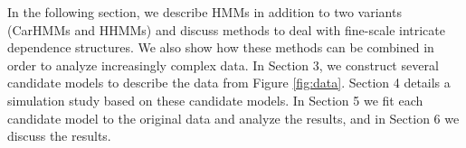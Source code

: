 
In the following section, we describe HMMs in addition to two variants (CarHMMs and HHMMs) and discuss methods to deal with fine-scale intricate dependence structures. We also show how these methods can be combined in order to analyze increasingly complex data. In Section 3, we construct several candidate models to describe the data from Figure \ref{fig:data}. Section 4 details a simulation study based on these candidate models. In Section 5 we fit each candidate model to the original data and analyze the results, and in Section 6 we discuss the results.
